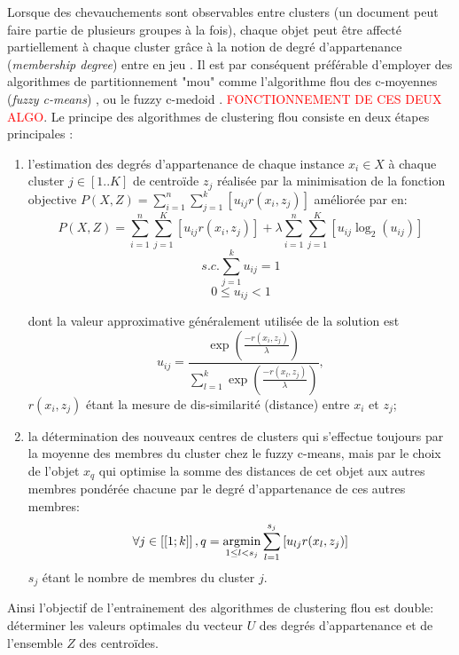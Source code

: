 Lorsque des chevauchements sont observables entre clusters (un document peut faire partie de plusieurs groupes à la fois), chaque objet peut être affecté partiellement à chaque cluster grâce à la notion de degré d'appartenance (\textit{membership degree}) entre en jeu \citep{baraldi1999surveyfuzzyclstering}. Il est par conséquent préférable d'employer des algorithmes de partitionnement "mou" comme l'algorithme flou des c-moyennes (\textit{fuzzy c-means}) \citep{bezdek1984fcm, hathaway1989fuzzycmeans}, ou le fuzzy c-medoid \citep{krishnapuram2001fuzzycmedoids}. \textcolor{red}{FONCTIONNEMENT DE CES DEUX ALGO}. Le principe des algorithmes de clustering flou consiste en deux étapes principales \citep{sabzi2011fuzzykmedoids}: 

\begin{enumerate}
 \item l'estimation des degrés d'appartenance de chaque instance $x_i \in X$ à chaque cluster $j \in [1..K]$ de centroïde $z_j$ réalisée par la minimisation de la fonction objective $P(X,Z) = \sum\limits_{i=1}^{n}\sum\limits_{j=1}^{k} \left[u_{ij}r(x_i,z_j)\right]$ \citep{krishnapuram2001fuzzycmedoids}  améliorée par \citet{sabzi2011fuzzykmedoids} en:
 \[P(X,Z) = \sum\limits_{i=1}^{n}\sum\limits_{j=1}^{K} \left[u_{ij}r(x_i,z_j)\right] + \lambda \sum\limits_{i=1}^{n}\sum\limits_{j=1}^{K} \left[ u_{ij}\log_2(u_{ij}) \right] \]
 \[s.c. \sum\limits_{j=1}^{k} u_{ij} = 1\]
 \[0 \leq u_{ij} < 1\]
 
 dont la valeur approximative généralement utilisée de la solution est \[u_{ij} = \frac{\exp\left(\frac{-r(x_i,z_j)}{\lambda}\right)}{\sum_{l=1}^{k}\exp\left(\frac{-r(x_l,z_j)}{\lambda}\right)},\] $r(x_i,z_j)$ étant la mesure de dis-similarité (distance) entre $x_i$ et  $z_j$;
 \item la détermination des nouveaux centres de clusters qui s'effectue toujours par la moyenne des membres du cluster chez le fuzzy c-means, mais par le choix de l'objet $x_q$ qui optimise la somme des distances de cet objet aux autres membres pondérée chacune par le degré d'appartenance de ces autres membres: \[\forall j \in \left[ \left[1;k \right] \right], q = \mathop{\mathrm{argmin}}\limits\limits_{1 \leq l < s_j} \sum\limits_{l=1}^{s_j} \left[u_{lj}r(x_l,z_j)\right]\] $s_j$ étant le nombre de membres du cluster $j$.
\end{enumerate}
 Ainsi l'objectif de l'entrainement des algorithmes de clustering flou est double: déterminer les valeurs optimales du vecteur  $U$ des degrés d'appartenance et de l'ensemble $Z$ des centroïdes. 
 
